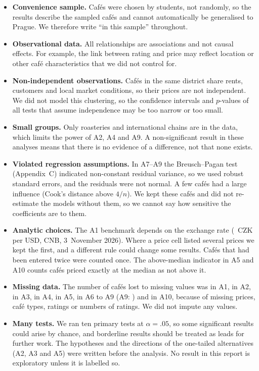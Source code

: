 \documentclass[11pt,a4paper]{article}
\begin{document}
\begin{itemize}
  \item \textbf{Convenience sample.} Caf\'es were chosen by students, not randomly, so the results describe the sampled caf\'es and cannot automatically be generalised to Prague. We therefore write ``in this sample'' throughout.
  \item \textbf{Observational data.} All relationships are associations and not causal effects. For example, the link between rating and price may reflect location or other caf\'e characteristics that we did not control for.
  \item \textbf{Non-independent observations.} Caf\'es in the same district share rents, customers and local market conditions, so their prices are not independent. We did not model this clustering, so the confidence intervals and $p$-values of all tests that assume independence may be too narrow or too small.
  \item \textbf{Small groups.} Only \ATwoNRoast{} roasteries and \AFourNInt{} international chains are in the data, which limits the power of A2, A4 and A9. A non-significant result in these analyses means that there is no evidence of a difference, not that none exists.
  \item \textbf{Violated regression assumptions.} In A7--A9 the Breusch--Pagan test (Appendix~C) indicated non-constant residual variance, so we used robust standard errors, and the residuals were not normal. A few caf\'es had a large influence (Cook's distance above $4/n$). We kept these caf\'es and did not re-estimate the models without them, so we cannot say how sensitive the coefficients are to them.
  \item \textbf{Analytic choices.} The A1 benchmark depends on the exchange rate (\AOneRate{}~CZK per USD, CNB, 3~November 2026). Where a price cell listed several prices we kept the first, and a different rule could change some results. Caf\'es that had been entered twice were counted once. The above-median indicator in A5 and A10 counts caf\'es priced exactly at the median as not above it.
  \item \textbf{Missing data.} The number of caf\'es lost to missing values was \AOneLost{} in A1, \ATwoLost{} in A2, \AThreeLost{} in A3, \AFourLost{} in A4, \AFiveLost{} in A5, \ASixLost{} in A6 to A9 (A9: \ANineLost{}) and \ATenLost{} in A10, because of missing prices, caf\'e types, ratings or numbers of ratings. We did not impute any values.
  \item \textbf{Many tests.} We ran ten primary tests at $\alpha = .05$, so some significant results could arise by chance, and borderline results should be treated as leads for further work. The hypotheses and the directions of the one-tailed alternatives (A2, A3 and A5) were written before the analysis. No result in this report is exploratory unless it is labelled so.
\end{itemize}
\end{document}
